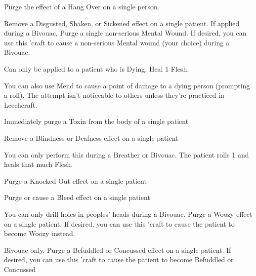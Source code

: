   \LEECHCRAFT[
    Name=Hair of the Dog,
    Link=leechcraft-hair-of-the-dog,
    Target=2,
    Keywords=Purge,
    Reversible=N
  ]

  Purge the effect of a Hang Over on a single person.

  \LEECHCRAFT[
    Name=Laudanum,
    Link=leechcraft-laudanum,
    Target=9,
    Keywords=Purge,
    Reversible=Y 
  ]

  Remove a Disgusted, Shaken, or Sickened effect on a single patient.  If applied during a Bivouac, Purge a single non-serious Mental Wound.   If desired, you can use this 'craft to cause a non-serious Mental wound (your choice) during a Bivouac.

  \LEECHCRAFT[
    Name=Mend,
    Link=leechcraft-mend,
    Target=2,
    Keywords=None,
    Reversible=Y
  ]

  Can only be applied to a patient who is Dying. Heal 1 Flesh.  

  You can also use Mend to cause a point of damage to a dying person (prompting a \DEATH roll).  The attempt isn't noticeable to others unless they're practiced in Leechcraft.

  \LEECHCRAFT[
    Name=Purge Toxin,
    Link=leechcraft-purge-toxin,
    Target=6,
    Keywords=None,
    Reversible=N 
  ]

  Immediately purge a Toxin from the body of a single patient

  \LEECHCRAFT[
    Name=Restore Senses,
    Link=leechcraft-restore-senses,
    Target=6,
    Keywords=None,
    Reversible=N 
  ]
  Remove a Blindness or Deafness effect on a single patient

  \LEECHCRAFT[
    Name=Sew Wounds,
    Link=leechcraft-sew-wounds,
    Target=4,
    Keywords=None,
    Reversible=N
  ]
  You can only perform this during a Breather or Bivouac. The patient rolls 1 \FLESH and heals that much Flesh.

  \LEECHCRAFT[
    Name=Smelling Salts,
    Link=leechcraft-smelling-salts,
    Target=3,
    Keywords=Purge,
    Reversible=N
  ]
  Purge a Knocked Out effect on a single patient


  \LEECHCRAFT[
    Name=Staunch,
    Link=leechcraft-staunch,
    Target=4,
    Keywords=Purge,
    Reversible=Y
  ]
  Purge or cause a Bleed effect on a single patient


  \LEECHCRAFT[
    Name=Trepanation,
    Link=leechcraft-trepanation,
    Target=8,
    Keywords=Purge,
    Reversible=Y  
  ]
  You can only drill holes in peoples' heads during a Bivouac.  Purge a Woozy effect on a single patient.   If desired, you can use this 'craft to cause the patient to become Woozy instead.

  \LEECHCRAFT[
    Name=Virtigo,
    Link=leechcraft-virtigo,
    Target=6,
    Keywords=None,
    Reversible=Y 
  ]
  
  Bivouac only.  Purge a Befuddled or Concussed effect on a single patient.   If desired, you can use this 'craft to cause the patient to become Befuddled or Concussed


